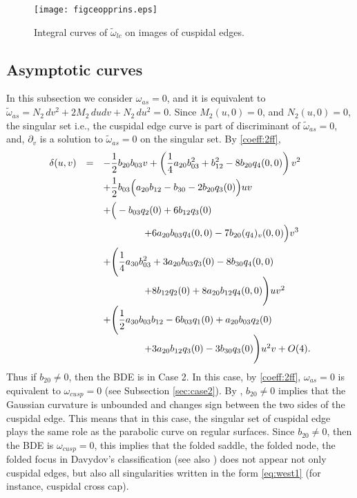 \documentclass[a4paper, 12pt]{article}
\theoremstyle{definition}
\numberwithin{equation}{section}
\begin{document}
\begin{figure}[!ht]
\centering
\texttt{[image: figceopprins.eps]}
\caption{Integral curves of
$\widetilde\omega_{lc}$
on images of cuspidal edges.}
\label{fig:prin}
\end{figure}

\subsection{Asymptotic curves}
In this subsection we consider $\omega_{as}=0$,
and it is equivalent to
$\widetilde\omega_{as}=N_2\,dv^2+2M_2\,dudv+N_2\,du^2=0$.
Since
$M_2(u,0)=0$, and
$N_2(u,0)=0$,
the singular set i.e., the cuspidal edge curve
is part of discriminant of $\widetilde\omega_{as}=0$,
and, $\partial_v$ is a solution to $\widetilde\omega_{as}=0$
on the singular set.
By \eqref{coeff:2ff},
\begin{equation}\label{eq:delta}
\begin{array}{rcl}
\displaystyle \delta(u,v) &=&
\displaystyle
-\dfrac{1}{2}b_{20}b_{03}v
+\left(\frac{1}{4}a_{20} b_{03}^2 + b_{12}^2
- 8 b_{20}q_4(0,0)\right) v^2 \\[3mm]
&&
+
\dfrac{1}{2}
b_{03}\Big(a_{20} b_{12} - b_{30}-2b_{20}q_3(0)\Big)uv\\[3mm]
&&
\displaystyle
+
\Big(-b_{03}q_2(0) + 6 b_{12} q_3(0) \\[3mm]
&&
\displaystyle
\hspace{15mm}
+ 6 a_{20} b_{03} q_4(0,0)-7b_{20}(q_4)_v(0,0)\Big)v^3\\[3mm]
&&\displaystyle
+
\Bigg(
\frac{1}{4}a_{30} b_{03}^2 + 3 a_{20} b_{03} q_3(0)
-
8 b_{30} q_4(0,0) \\[3mm]
&&\hspace{15mm}
+ 8 b_{12}q_2(0) 
+ 8 a_{20}b_{12} q_4(0,0)
\Bigg)uv^2\\[3mm]
&&
\displaystyle
+
\Bigg(\frac{1}{2}a_{30} b_{03} b_{12}
- 6 b_{03} q_1(0) + a_{20} b_{03} q_2(0)
\\[3mm]
&&\hspace{15mm}
+
3 a_{20} b_{12} q_3(0) - 3 b_{30} q_3(0)\Bigg)u^2v
+
O(4).
\end{array}
\end{equation}
Thus if $b_{20}\ne0$, then 
the BDE is in Case 2.
In this case, by \eqref{coeff:2ff},
$\omega_{as}=0$
is equivalent to $\omega_{cusp}=0$
(see Subsection \ref{sec:case2}).
By \cite[Corollary 3.6]{front}, 
$b_{20}\ne0$ implies that
the Gaussian curvature 
is unbounded and changes sign between 
the two sides of the cuspidal edge.
This means that in this case, the singular set of
cuspidal edge plays the same role as the 
parabolic curve on regular surfaces.
Since 
$b_{20}\ne0$, then 
the BDE is $\omega_{cusp}=0$,
this implies that the folded saddle, the
folded node, the folded
focus in Davydov's classification \cite{d1}
(see also \cite[Section 3.2]{faridsurvey})
does not appear not only cuspidal edges,
but also all singularities written in the form
\eqref{eq:west1} (for instance, cuspidal cross cap).
\end{document}
